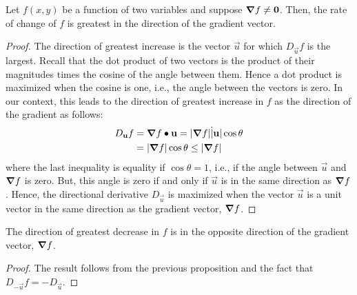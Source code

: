 \documentclass[handout]{ximera}
\begin{document}
\begin{proposition}
Let $f(x,y)$ be a function of two variables and suppose $\boldsymbol\nabla f \neq \mathbf 0$. 
Then, the rate of change of $f$ is greatest in the direction of the gradient vector.

\end{proposition}

\begin{proof}
The direction of greatest increase is the vector $\vec u$ for which $D_{\vec u}f$ is the largest. 
Recall that the dot product of two vectors is the product of their magnitudes times the cosine of the angle between them.  
Hence a dot product is maximized when the cosine is one, i.e., the angle between the vectors is zero.  
In our context, this leads to the direction of greatest
increase in $f$ as the direction of the gradient as follows:
\begin{align*}
D_{\mathbf u} f &= \boldsymbol\nabla f \bullet \mathbf u = |\boldsymbol\nabla f| \dot |\mathbf u| \cos \theta\\
             &= |\boldsymbol\nabla f| \cos \theta \leq |\boldsymbol\nabla f|
\end{align*}
where the last inequality is equality if $\cos \theta = 1$, i.e., if the angle between $\vec u$ and $\boldsymbol\nabla f$ is zero.
But, this angle is zero if and only if $\vec u$ is in the same direction as $\boldsymbol\nabla f$.  Hence, the directional derivative
$D_{\vec u}$ is maximized when the vector $\vec u$ is a unit vector in the same direction as the gradient vector, $\boldsymbol\nabla f$.
\end{proof}

\begin{corollary}
The direction of greatest decrease in $f$ is in the opposite direction of the gradient vector, $\boldsymbol\nabla f$.
\end{corollary}
\begin{proof}
The result follows from the previous proposition and the fact that $D_{-\vec u} f = -D_{\vec u}$.
\end{proof}
\end{document}

